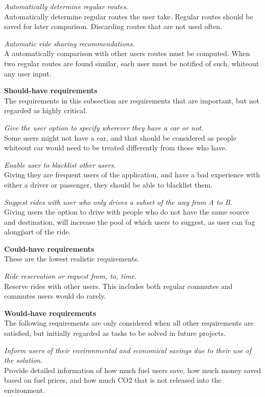 \textit{Automatically determine regular routes.}\\
Automatically determine regular routes the user take. 
Regular routes should be saved for later comparison. 
Discarding routes that are not used often.

\textit{Automatic ride sharing recommendations.}\\
A automatically comparison with other users routes must be computed. When two regular routes are found similar, each user must be notified of such, whiteout any user input.


\textbf{Should-have requirements}\\
The requirements in this subsection are requirements that are important, but not regarded as highly critical.

\textit{Give the user option to specify wherever they have a car or not.}\\
Some users might not have a car, and that should be considered as people whiteout car would need to be treated differently from those who have.

\textit{Enable user to blacklist other users.}\\
Giving they are frequent users of the application, and have a bad experience with either a driver or passenger, they should be able to blacklist them.

\textit{Suggest rides with user who only drives a subset of the way from A to B.}\\
Giving users the option to drive with people who do not have the same source and destination, will increase the pool of which users to suggest, as user can \"tag along\" part of the ride.


\textbf{Could-have requirements}\\
These are the lowest realistic requirements. 

\textit{Ride reservation or request from, to, time.}\\
Reserve rides with other users. 
This includes both regular commutes and commutes users would do rarely.

\textbf{Would-have requirements}\\
The following requirements are only considered when all other requirements are satisfied, but initially regarded as tasks to be solved in future projects.

\textit{Inform users of their environmental and economical savings due to their use of the solution.}\\
Provide detailed information of how much fuel users save, how much money saved based on fuel prices, and how much CO2 that is not released into the environment. 

